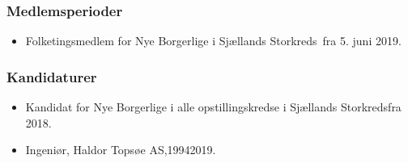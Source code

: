 \documentclass[11pt, a4paper]{awesome-cv}
\begin{document}
\begin{cvletter}
\subsubsection*{Medlemsperioder}
\begin{itemize}
\item Folketingsmedlem for Nye Borgerlige i Sjællands Storkreds fra 5. juni 2019.
\end{itemize}
\subsubsection*{Kandidaturer}
\begin{itemize}
\item Kandidat for Nye Borgerlige i alle opstillingskredse i Sjællands Storkredsfra 2018.
\end{itemize}
\begin{itemize}
\item Ingeniør, Haldor Topsøe AS,19942019.
\end{itemize}
\end{cvletter}
\end{document}
